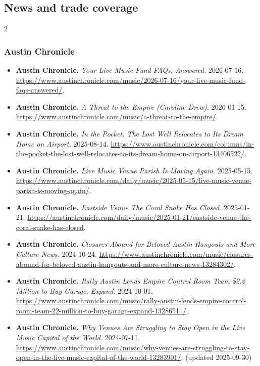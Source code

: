 \subsection*{News and trade coverage}
{\scriptsize\renewcommand{\baselinestretch}{0.88}\selectfont\raggedright
\begin{multicols}{2}
\setlength{\parskip}{0pt}
\subsubsection*{Austin Chronicle}
\begin{itemize}[itemsep=0pt,topsep=1pt,parsep=0pt,partopsep=0pt,leftmargin=1em]
\item \textbf{Austin Chronicle.} \textit{Your Live Music Fund FAQs, Answered.} 2026-07-16. \url{https://www.austinchronicle.com/music/2026-07-16/your-live-music-fund-faqs-answered/}.
\item \textbf{Austin Chronicle.} \textit{A Threat to the Empire (Caroline Drew).} 2026-01-15. \url{https://www.austinchronicle.com/music/a-threat-to-the-empire/}.
\item \textbf{Austin Chronicle.} \textit{In the Pocket: The Lost Well Relocates to Its Dream Home on Airport.} 2025-08-14. \url{https://www.austinchronicle.com/columns/in-the-pocket-the-lost-well-relocates-to-its-dream-home-on-airport-13406522/}.
\item \textbf{Austin Chronicle.} \textit{Live Music Venue Parish Is Moving Again.} 2025-05-15. \url{https://www.austinchronicle.com/daily/music/2025-05-15/live-music-venue-parish-is-moving-again/}.
\item \textbf{Austin Chronicle.} \textit{Eastside Venue The Coral Snake Has Closed.} 2025-01-21. \url{https://austinchronicle.com/daily/music/2025-01-21/eastside-venue-the-coral-snake-has-closed}.
\item \textbf{Austin Chronicle.} \textit{Closures Abound for Beloved Austin Hangouts and More Culture News.} 2024-10-24. \url{https://www.austinchronicle.com/music/closures-abound-for-beloved-austin-hangouts-and-more-culture-news-13284302/}.
\item \textbf{Austin Chronicle.} \textit{Rally Austin Lends Empire Control Room Team \$2.2 Million to Buy Garage, Expand.} 2024-10-01. \url{https://www.austinchronicle.com/music/rally-austin-lends-empire-control-room-team-22-million-to-buy-garage-expand-13286511/}.
\item \textbf{Austin Chronicle.} \textit{Why Venues Are Struggling to Stay Open in the Live Music Capital of the World.} 2024-07-11. \url{https://www.austinchronicle.com/music/why-venues-are-struggling-to-stay-open-in-the-live-music-capital-of-the-world-13283901/}. {\color{ammuted}(updated 2025-09-30)}

\end{itemize}
\end{multicols}}

